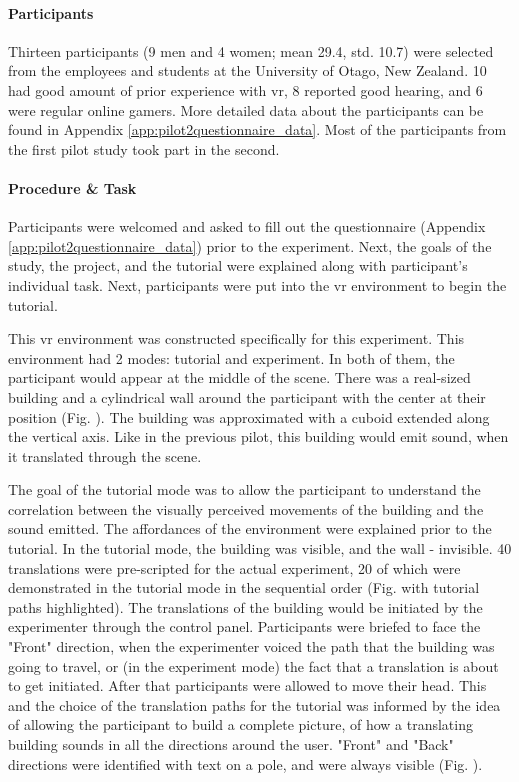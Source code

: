 \paragraph{Participants}
Thirteen participants (9 men and 4 women; mean 29.4, std. 10.7) were selected from the employees and students at the University of Otago, New Zealand. 10 had good amount of prior experience with \gls{vr}, 8 reported good hearing, and 6 were regular online gamers. More detailed data about the participants can be found in Appendix \ref{app:pilot2questionnaire_data}. Most of the participants from the first pilot study took part in the second.

\paragraph{Procedure \& Task}
Participants were welcomed and asked to fill out the questionnaire (Appendix \ref{app:pilot2questionnaire_data}) prior to the experiment. Next, the goals of the study, the project, and the tutorial were explained along with participant's individual task. Next, participants were put into the \gls{vr} environment to begin the tutorial.

This \gls{vr} environment was constructed specifically for this experiment. This environment had 2 modes: tutorial and experiment. In both of them, the participant would appear at the middle of the scene. There was a real-sized building and a cylindrical wall around the participant with the center at their position (Fig. ). The building was approximated with a cuboid extended along the vertical axis. Like in the previous pilot, this building would emit sound, when it translated through the scene.

The goal of the tutorial mode was to allow the participant to understand the correlation between the visually perceived movements of the building and the sound emitted. The affordances of the environment were explained prior to the tutorial. 
In the tutorial mode, the building was visible, and the wall - invisible.
40 translations were pre-scripted for the actual experiment, 20 of which were demonstrated in the tutorial mode in the sequential order (Fig. with tutorial paths highlighted). The translations of the building would be initiated by the experimenter through the control panel. Participants were briefed to face the "Front" direction, when the experimenter voiced the path that the building was going to travel, or (in the experiment mode) the fact that a translation is about to get initiated. After that participants were allowed to move their head. This and the choice of the translation paths for the tutorial was informed by the idea of allowing the participant to build a complete picture, of how a translating building sounds in all the directions around the user. "Front" and "Back" directions were identified with text on a pole, and were always visible (Fig. ).

